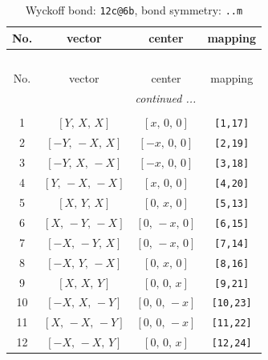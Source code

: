 \documentclass[fleqn,8pt]{jsarticle}
\begin{document}
\begin{longtable}{cccc}
\caption{Wyckoff bond: {\tt 12c@6b}, bond symmetry: {\tt ..m}}
 \\
 \hline \hline
No. & vector & center & mapping \\ \hline \endfirsthead

\multicolumn{3}{l}{\tablename\ \thetable{}} \\
 \hline \hline
No. & vector & center & mapping \\ \hline \endhead

 \hline \hline
\multicolumn{3}{r}{\footnotesize\it continued ...} \\ \endfoot

 \hline \hline
\multicolumn{3}{r}{} \\ \endlastfoot

1 & $\left[ Y,\, X,\, X \right]$ & $\left[ x,\, 0,\, 0 \right]$ & {\tt [1,17]} \\ \hline
2 & $\left[ - Y,\, - X,\, X \right]$ & $\left[ - x,\, 0,\, 0 \right]$ & {\tt [2,19]} \\ \hline
3 & $\left[ - Y,\, X,\, - X \right]$ & $\left[ - x,\, 0,\, 0 \right]$ & {\tt [3,18]} \\ \hline
4 & $\left[ Y,\, - X,\, - X \right]$ & $\left[ x,\, 0,\, 0 \right]$ & {\tt [4,20]} \\ \hline
5 & $\left[ X,\, Y,\, X \right]$ & $\left[ 0,\, x,\, 0 \right]$ & {\tt [5,13]} \\ \hline
6 & $\left[ X,\, - Y,\, - X \right]$ & $\left[ 0,\, - x,\, 0 \right]$ & {\tt [6,15]} \\ \hline
7 & $\left[ - X,\, - Y,\, X \right]$ & $\left[ 0,\, - x,\, 0 \right]$ & {\tt [7,14]} \\ \hline
8 & $\left[ - X,\, Y,\, - X \right]$ & $\left[ 0,\, x,\, 0 \right]$ & {\tt [8,16]} \\ \hline
9 & $\left[ X,\, X,\, Y \right]$ & $\left[ 0,\, 0,\, x \right]$ & {\tt [9,21]} \\ \hline
10 & $\left[ - X,\, X,\, - Y \right]$ & $\left[ 0,\, 0,\, - x \right]$ & {\tt [10,23]} \\ \hline
11 & $\left[ X,\, - X,\, - Y \right]$ & $\left[ 0,\, 0,\, - x \right]$ & {\tt [11,22]} \\ \hline
12 & $\left[ - X,\, - X,\, Y \right]$ & $\left[ 0,\, 0,\, x \right]$ & {\tt [12,24]} \\
\end{longtable}
\renewcommand{\arraystretch}{1.2}
\end{document}
